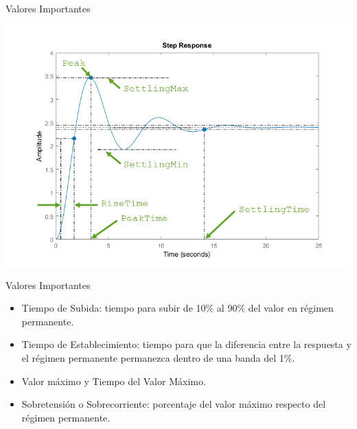 \documentclass[xcolor={usenames,svgnames,dvipsnames}]{beamer}
\begin{document}
\begin{frame}[label={sec:orge16b534}]{Valores Importantes}
\begin{center}
\includegraphics[width=.9\linewidth]{../figs/RespuestaEscalon_SegundoOrden.png}
\end{center}
\end{frame}

\begin{frame}[label={sec:orgaa8dcee}]{Valores Importantes}
\begin{itemize}
\item \alert{Tiempo de Subida}: tiempo para subir de 10\% al 90\% del valor en régimen permanente.

\item \alert{Tiempo de Establecimiento}: tiempo para que la diferencia entre la respuesta y el régimen permanente permanezca dentro de una banda del 1\%.

\item \alert{Valor máximo} y \alert{Tiempo del Valor Máximo}.

\item \alert{Sobretensión} o \alert{Sobrecorriente}: porcentaje del valor máximo respecto del régimen permanente.
\end{itemize}
\end{frame}
\end{document}
